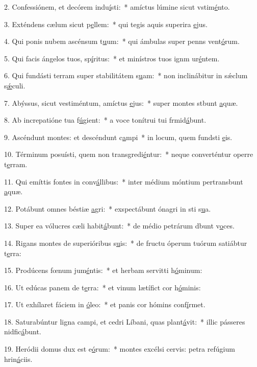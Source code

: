 2. Confessiónem, et decórem indu\uline{í}sti:~* amíctus lúmine sicut vstim\uline{é}nto.\par 
3. Exténdens cælum sicut p\uline{e}llem:~* qui tegis aquis superira \uline{e}jus.\par 
4. Qui ponis nubem ascénsum t\uline{u}um:~* qui ámbulas super penns vent\uline{ó}rum.\par 
5. Qui facis ángelos tuos, sp\uline{í}ritus:~* et minístros tuos ignm ur\uline{é}ntem.\par 
6. Qui fundásti terram super stabilitátem s\uline{u}am:~* non inclinábitur in sǽclum s\uline{ǽ}culi.\par 
7. Abýssus, sicut vestiméntum, amíctus \uline{e}jus:~* super montes stbunt \uline{a}quæ.\par 
8. Ab increpatióne tua f\uline{ú}gient:~* a voce tonítrui tui frmid\uline{á}bunt.\par 
9. Ascéndunt montes: et descéndunt c\uline{a}mpi~* in locum, quem fundsti \uline{e}is.\par 
10. Términum posuísti, quem non transgredi\uline{é}ntur:~* neque converténtur operre t\uline{e}rram.\par 
11. Qui emíttis fontes in conv\uline{á}llibus:~* inter médium móntium pertransbunt \uline{a}quæ.\par 
12. Potábunt omnes béstiæ \uline{a}gri:~* exspectábunt ónagri in sti s\uline{u}a.\par 
13. Super ea vólucres cæli habit\uline{á}bunt:~* de médio petrárum dbunt v\uline{o}ces.\par 
14. Rigans montes de superióribus s\uline{u}is:~* de fructu óperum tuórum satiábtur t\uline{e}rra:\par 
15. Prodúcens fœnum jum\uline{é}ntis:~* et herbam servitti h\uline{ó}minum:\par 
16. Ut edúcas panem de t\uline{e}rra:~* et vinum lætífict cor h\uline{ó}minis:\par 
17. Ut exhílaret fáciem in \uline{ó}leo:~* et panis cor hómins conf\uline{í}rmet.\par 
18. Saturabúntur ligna campi, et cedri Líbani, quas plant\uline{á}vit:~* illic pásseres nidfic\uline{á}bunt.\par 
19. Heródii domus dux est e\uline{ó}rum:~* montes excélsi cervis: petra refúgium hrin\uline{á}ciis.\par 
